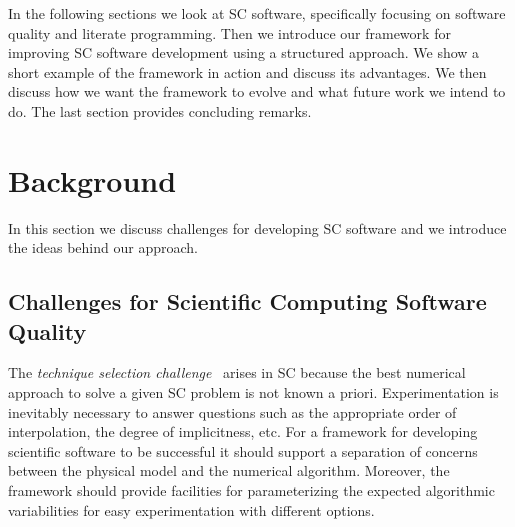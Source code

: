 \documentclass{sig-alternate-05-2015}
\begin{document}
In the following sections we  
look at SC software, specifically focusing on software quality and literate
programming.
Then we introduce our framework %
for improving SC software development using a structured approach.  We show
a short example of the framework in action and discuss its advantages. 
We then discuss how we want the framework to evolve and what future work we
intend to do. %
The last section provides concluding remarks.

\section{Background} \label{sec:background}

In this section we discuss challenges for developing SC software and we
introduce the ideas behind our approach.

\subsection{Challenges for Scientific Computing Software
  Quality} \label{ssec:challenges}


The \textit{technique selection challenge}~\cite{Yu2011} arises in SC because
the best numerical approach to solve a given SC problem is not known a priori.  
Experimentation is inevitably necessary to answer questions such as the
appropriate order of interpolation, the degree of implicitness, etc.  For a
framework for developing scientific software to be successful it should support
a separation of concerns between the physical model and the numerical
algorithm.  Moreover, the framework should provide facilities for parameterizing
the expected algorithmic variabilities for easy experimentation with different
options.
\end{document}
